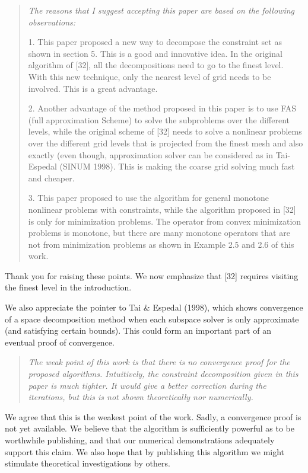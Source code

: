 \documentclass[letterpaper,final,12pt,reqno]{amsart}
\newenvironment{review}%
{\bigskip \par \begin{quote} \selectfont \sl}%
{\end{quote}}
\newenvironment{response}%
{\medskip\noindent}%
{}
\begin{document}
\begin{review}
The reasons that I suggest accepting this paper are based on the following observations:

1. This paper proposed a new way to decompose the constraint set as shown in section 5. This is a good and innovative idea. In the original algorithm of [32], all the decompositions need to go to the finest level. With this new technique, only the nearest level of grid needs to be involved. This is a great advantage.

2. Another advantage of the method proposed in this paper is to use FAS (full approximation Scheme) to solve the subproblems over the different levels, while the original scheme of [32] needs to solve a nonlinear problems over the different grid levels that is projected from the finest mesh and also exactly (even though, approximation solver can be considered as in Tai-Espedal (SINUM 1998). This is making the coarse grid solving much fast and cheaper.

3. This paper proposed to use the algorithm for general monotone nonlinear problems with constraints, while the algorithm proposed in [32] is only for minimization problems. The operator from convex minimization problems is monotone, but there are many monotone operators that are not from minimization problems as shown in Example 2.5 and 2.6 of this work.
\end{review}

\begin{response}
Thank you for raising these points. We now emphasize that [32] requires visiting the finest level in the introduction.

We also appreciate the pointer to Tai \& Espedal (1998), which shows convergence of a space decomposition method when each subspace solver is only approximate (and satisfying certain bounds).  This could form an important part of an eventual proof of convergence.
\end{response}

\begin{review}
The weak point of this work is that there is no convergence proof for the proposed algorithms. Intuitively, the constraint decomposition given in this paper is much tighter. It would give a better correction during the iterations, but this is not shown theoretically nor numerically.
\end{review}

\begin{response}
We agree that this is the weakest point of the work.  Sadly, a convergence proof is not yet available.  We believe that the algorithm is sufficiently powerful as to be worthwhile publishing, and that our numerical demonstrations adequately support this claim. We also hope that by publishing this algorithm we might stimulate theoretical investigations by others.
\end{response}
\end{document}
